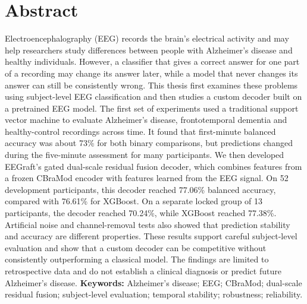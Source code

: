 \chapter*{Abstract}
Electroencephalography (EEG) records the brain's electrical activity and may help researchers study differences between people with Alzheimer's disease and healthy individuals. However, a classifier that gives a correct answer for one part of a recording may change its answer later, while a model that never changes its answer can still be consistently wrong. This thesis first examines these problems using subject-level EEG classification and then studies a custom decoder built on a pretrained EEG model. The first set of experiments used a traditional support vector machine to evaluate Alzheimer's disease, frontotemporal dementia and healthy-control recordings across time. It found that first-minute balanced accuracy was about 73\% for both binary comparisons, but predictions changed during the five-minute assessment for many participants. We then developed EEGraft's gated dual-scale residual fusion decoder, which combines features from a frozen CBraMod encoder with features learned from the EEG signal. On 52 development participants, this decoder reached 77.06\% balanced accuracy, compared with 76.61\% for XGBoost. On a separate locked group of 13 participants, the decoder reached 70.24\%, while XGBoost reached 77.38\%. Artificial noise and channel-removal tests also showed that prediction stability and accuracy are different properties. These results support careful subject-level evaluation and show that a custom decoder can be competitive without consistently outperforming a classical model. The findings are limited to retrospective data and do not establish a clinical diagnosis or predict future Alzheimer's disease.
\vspace{0.5cm}
\noindent\textbf{Keywords:} Alzheimer's disease; EEG; CBraMod; dual-scale residual fusion; subject-level evaluation; temporal stability; robustness; reliability.
